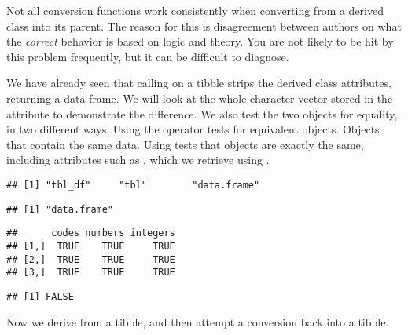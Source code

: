 \documentclass[krantz2]{krantz}\usepackage{knitr}
\begin{document}
\begin{explainbox}
Not all conversion functions work consistently when converting from a derived class into its parent. The reason for this is disagreement between authors on what the \emph{correct} behavior is based on logic and theory. You are not likely to be hit by this problem frequently, but it can be difficult to diagnose.

We have already seen that calling  on a tibble strips the derived class attributes, returning a data frame. We will look at the whole character vector stored in the  attribute to demonstrate the difference. We also test the two objects for equality, in two different ways. Using the operator \code{==} tests for equivalent objects. Objects that contain the same data. Using  tests that objects are exactly the same, including attributes such as , which we retrieve using .

\begin{knitrout}\footnotesize
{}\color{fgcolor}\begin{kframe}
\begin{alltt}
\end{alltt}
\begin{verbatim}
## [1] "tbl_df"     "tbl"        "data.frame"
\end{verbatim}
\begin{alltt}
\end{alltt}
\begin{verbatim}
## [1] "data.frame"
\end{verbatim}
\begin{alltt}
 \hlopt{==} 
\end{alltt}
\begin{verbatim}
##      codes numbers integers
## [1,]  TRUE    TRUE     TRUE
## [2,]  TRUE    TRUE     TRUE
## [3,]  TRUE    TRUE     TRUE
\end{verbatim}
\begin{alltt}
\end{alltt}
\begin{verbatim}
## [1] FALSE
\end{verbatim}
\end{kframe}
\end{knitrout}

Now we derive from a tibble, and then attempt a conversion back into a tibble.


\end{explainbox}
\end{document}
